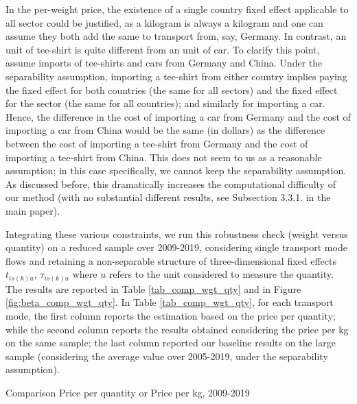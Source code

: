 \documentclass[11pt,twoside, authoryear]{elsarticle}
\begin{document}
In the per-weight price, the existence of a single country fixed effect applicable to all sector could be justified, as a kilogram is always a kilogram and one can assume they both add the same to transport from, say, Germany. In contrast, an unit of tee-shirt is quite different from an unit of car. To clarify this point, assume imports of tee-shirts and cars from Germany and China. Under the separability assumption, importing a tee-shirt from either country implies paying the fixed effect for both countries (the same for all sectors) and the fixed effect for the sector (the same for all countries); and similarly for importing a car. Hence, the difference in the cost of importing a car from Germany and the cost of importing a car from China would be the same (in dollars) as the difference between the cost of importing a tee-shirt from Germany and the cost of importing a tee-shirt from China. This does not seem to us as a reasonable assumption; in this case specifically, we cannot keep the separability assumption.
As discussed before, this dramatically increases the computational difficulty of our method (with no substantial different results, see Subsection 3.3.1. in the main paper).\smallskip

Integrating these various constraints, we run this robustness check (weight versus quantity) on a reduced sample over 2009-2019, considering single transport mode flows and retaining a non-separable structure of three-dimensional fixed effects $t_{is(k)u}$, $\tau_{is(k)u}$ where $u$ refers to the unit considered to measure the quantity. The results are reported in Table \ref{tab_comp_wgt_qty} and in Figure \ref{fig:beta_comp_wgt_qty}. In Table \ref{tab_comp_wgt_qty}, for each transport mode, the first column reports the estimation based on the price per quantity; while the second column reports the results obtained considering the price per kg on the same sample; the last column reported our baseline results on the large sample (considering the average value over 2005-2019, under the separability assumption).


\begin{table}[htbp]
	\caption{Comparison Price per quantity or Price per kg, 2009-2019}
	\begin{center}		
		
	\end{center}
	\label{tab_comp_wgt_qty}%
\end{table}%
\end{document}
